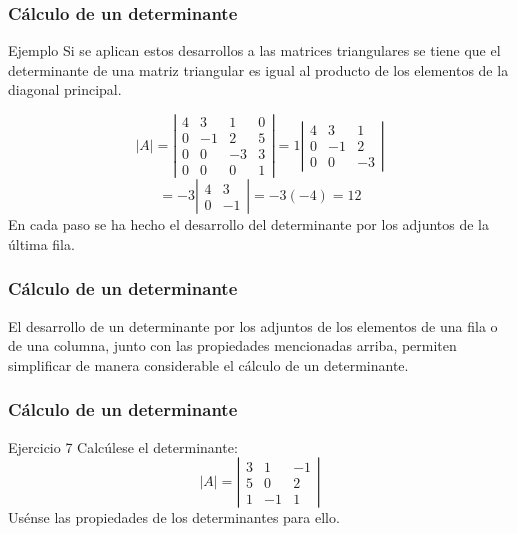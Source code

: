 \documentclass[12pt]{article}
\begin{document}
\begin{frame}
  \frametitle{C\'alculo de un determinante}
     \begin{block}{Ejemplo}
     Si se aplican estos desarrollos a las matrices triangulares se tiene que el determinante de una matriz triangular es igual al producto de los elementos de la diagonal principal.

\end{block}

\[|A| = \left|\begin{array}{cccc}4 & 3 & 1 & 0 \\0 & -1 & 2 & 5 \\0 & 0 & -3 & 3  \\0 & 0 & 0 & 1\end{array}\right| = 
 1\left|\begin{array}{cccc}4 & 3 & 1  \\0 & -1 & 2 \\0 & 0 & -3 \end{array}\right|\]
 \[
 =  -3\left|\begin{array}{cccc}4 & 3   \\0 & -1  \end{array}\right|
 =  -3(-4) = 12
 \]
En cada paso se ha hecho el desarrollo del determinante por los adjuntos de la \'ultima fila.
\end{frame} 



\begin{frame}
  \frametitle{C\'alculo de un determinante}
El desarrollo de un determinante por los adjuntos de los elementos de una fila o de una columna, junto con las propiedades mencionadas arriba, permiten simplificar de manera considerable el c\'alculo de un determinante.
\end{frame} 


\begin{frame}
  \frametitle{C\'alculo de un determinante}
     \begin{block}{Ejercicio 7}
Calc\'ulese el determinante:
\[|A| = \left|\begin{array}{ccc}3 & 1 & -1 \\5 & 0 & 2 \\1 & -1 & 1\end{array}\right|\]
Us\'ense las propiedades de los determinantes para ello.
\end{block}
\end{frame} 
\end{document}
